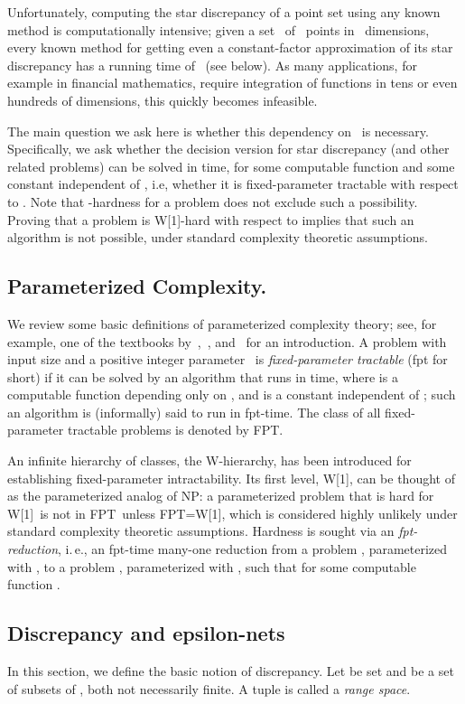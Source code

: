 \documentclass[12pt]{article}
\begin{document}
Unfortunately, computing the star discrepancy of a point set using any 
known method
is computationally intensive; given a set~ of~ points in~ 
dimensions,
every known method for getting even a constant-factor approximation of its star discrepancy 
has a running time of~ (see below).
As many applications, for example in financial mathematics, require 
integration of functions
in tens or even hundreds of dimensions, this quickly becomes infeasible.

The main question we ask here is whether this dependency on~ is
necessary.  Specifically, we ask whether the decision version for star discrepancy (and other related problems) can be
solved in  time, for some computable function  and some
constant  independent of , i.e, whether it is fixed-parameter
tractable with respect to . Note that -hardness
for a problem does not exclude such a possibility. Proving that a problem is
W[1]-hard with respect to  implies that such an
algorithm is not possible, under standard complexity theoretic
assumptions. 

\subsection{Parameterized Complexity.}
We review some basic definitions of parameterized complexity theory;
see, for example, one of the textbooks by~\cite{DF99},~\cite{FG06}, and~\cite{Nie06} for an introduction.
A problem with input size  and a positive integer parameter~ is
\emph{fixed-parameter tractable} (fpt for short) if it can be solved by an
algorithm that runs in  time, where  is a computable
function depending only on , and  is a constant independent of ;
such an algorithm is (informally) said to run in fpt-time.  The class of
all fixed-parameter tractable problems is denoted by FPT. 

An infinite hierarchy of classes, the W-hierarchy, has been introduced for establishing
fixed-parameter intractability.  Its first level, W[1], can be thought of
as the parameterized analog of NP: a parameterized problem that is hard for
W[1]\ is not in FPT\ unless FPT=W[1], which is considered highly
unlikely under standard complexity theoretic assumptions.  Hardness is
sought via an \emph{fpt-reduction}, i.\,e., an fpt-time many-one reduction
from a problem , parameterized with , to a problem ,
parameterized with , such that  for some computable
function . 


\subsection{Discrepancy and epsilon-nets}\label{Sec:Discrepancy}
In this section, we define the basic notion of discrepancy. Let  be set and  be a set of subsets of , both not necessarily finite. A tuple  is called a \emph{range space}.
\end{document}
